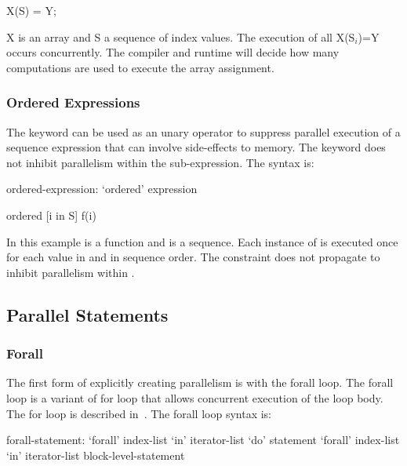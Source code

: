 \begin{example}
\begin{chapel}
X(S) = Y;
\end{chapel}
X is an array and S a sequence of index values. The execution of all X(S$_i$)=Y
occurs concurrently. The compiler and runtime will decide how many computations
are used to execute the array assignment.
\end{example}


\subsubsection{Ordered Expressions}
\label{Ordered_Expressions}

The  keyword can be used as an unary operator to
suppress parallel execution of a sequence expression that can involve
side-effects to memory. The  keyword does not inhibit
parallelism within the sub-expression. The syntax is:
\begin{syntax}
ordered-expression:
   `ordered' expression
\end{syntax}

\begin{example}
\begin{chapel}
ordered [i in S] f(i) 
\end{chapel}
In this example  is a function and  is a
sequence. Each instance of  is executed once for each value
in  and in sequence order. The  constraint does
not propagate to inhibit parallelism within .
\end{example}

\subsection{Parallel Statements}
\label{Parallel_Statements}



\subsubsection{Forall}
\label{Forall}

The first form of explicitly creating parallelism is with the forall
loop. The forall loop is a variant of for loop that allows concurrent
execution of the loop body. The for loop is described
in~. The forall loop syntax is:
\begin{syntax}
forall-statement:
   `forall' index-list `in' iterator-list `do' statement
   `forall' index-list `in' iterator-list block-level-statement
\end{syntax}

